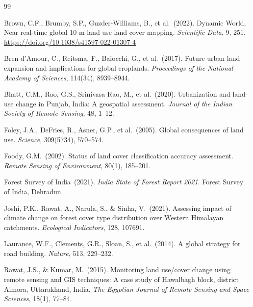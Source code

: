 \documentclass[12pt,a4paper]{article}
\begin{document}
\newpage

\begin{thebibliography}{99}

Brown, C.F., Brumby, S.P., Guzder-Williams, B., et al.\ (2022).
\newblock Dynamic World, Near real-time global 10 m land use land cover mapping.
\newblock \textit{Scientific Data}, 9, 251. \url{https://doi.org/10.1038/s41597-022-01307-4}

Bren d'Amour, C., Reitsma, F., Baiocchi, G., et al.\ (2017).
\newblock Future urban land expansion and implications for global croplands.
\newblock \textit{Proceedings of the National Academy of Sciences}, 114(34), 8939--8944.

Bhatt, C.M., Rao, G.S., Srinivasa Rao, M., et al.\ (2020).
\newblock Urbanization and land-use change in Punjab, India: A geospatial assessment.
\newblock \textit{Journal of the Indian Society of Remote Sensing}, 48, 1--12.

Foley, J.A., DeFries, R., Asner, G.P., et al.\ (2005).
\newblock Global consequences of land use.
\newblock \textit{Science}, 309(5734), 570--574.

Foody, G.M.\ (2002).
\newblock Status of land cover classification accuracy assessment.
\newblock \textit{Remote Sensing of Environment}, 80(1), 185--201.

Forest Survey of India\ (2021).
\newblock \textit{India State of Forest Report 2021}.
\newblock Forest Survey of India, Dehradun.

Joshi, P.K., Rawat, A., Narula, S., \& Sinha, V.\ (2021).
\newblock Assessing impact of climate change on forest cover type distribution over Western Himalayan catchments.
\newblock \textit{Ecological Indicators}, 128, 107691.

Laurance, W.F., Clements, G.R., Sloan, S., et al.\ (2014).
\newblock A global strategy for road building.
\newblock \textit{Nature}, 513, 229--232.

Rawat, J.S., \& Kumar, M.\ (2015).
\newblock Monitoring land use/cover change using remote sensing and GIS techniques: A case study of Hawalbagh block, district Almora, Uttarakhand, India.
\newblock \textit{The Egyptian Journal of Remote Sensing and Space Sciences}, 18(1), 77--84.


\end{thebibliography}
\end{document}
